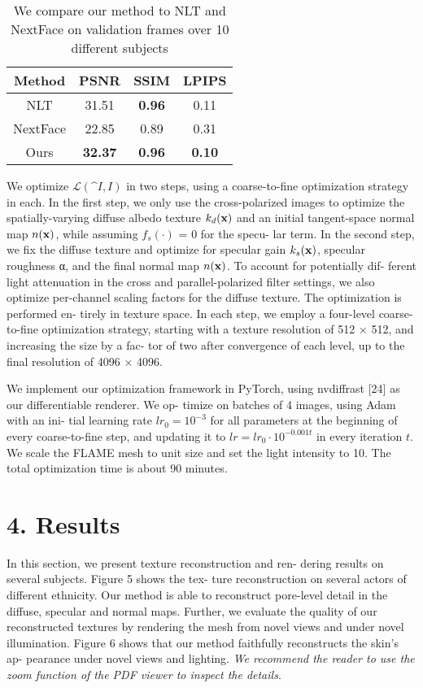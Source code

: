 \documentclass[twocolumn]{article}
\begin{document}
\begin{table}[]
    \centering
    \begin{tabular}{c c c c}
         \textbf{Method} &  \textbf{PSNR} & \textbf{SSIM} & \textbf{LPIPS}\\ \hline
         NLT & 31.51 & \textbf{0.96} & 0.11 \\
         NextFace & 22.85 & 0.89 & 0.31 \\\hline
         Ours & \textbf{32.37} & \textbf{0.96} & \textbf{0.10} \\\hline
    \end{tabular}
    \caption{We compare our method to NLT and NextFace on validation frames over 10 different subjects}
    \label{tab:Table 1}
\end{table}


\newpage
\indent We optimize $\mathcal{L}(\^I,I)$ in two steps, using a coarse-to-fine
optimization strategy in each. In the ﬁrst step, we only use
the cross-polarized images to optimize the spatially-varying
diffuse albedo texture ${k}_{d}({\bf x})$ and an initial tangent-space
normal map $n({\bf x})$, while assuming ${f}_{s}(\cdot)$ = 0 for the specu-
lar term. In the second step, we ﬁx the diffuse texture and
optimize for specular gain ${k}_{s}({\bf x})$, specular roughness α, and
the ﬁnal normal map $n({\bf x})$. To account for potentially dif-
ferent light attenuation in the cross and parallel-polarized
ﬁlter settings, we also optimize per-channel scaling factors
for the diffuse texture. The optimization is performed en-
tirely in texture space. In each step, we employ a four-level
coarse-to-ﬁne optimization strategy, starting with a texture
resolution of 512 × 512, and increasing the size by a fac-
tor of two after convergence of each level, up to the ﬁnal
resolution of 4096 × 4096.


We implement our optimization framework in PyTorch,
using nvdiffrast [24] as our differentiable renderer. We op-
timize on batches of 4 images, using Adam with an ini-
tial learning rate ${lr}_{0} = 10^{-3}$ for all parameters at the
beginning of every coarse-to-ﬁne step, and updating it to
$lr = {lr}_{0} \cdot 10^{-0.001t}$ in every iteration $t$. We scale the
FLAME mesh to unit size and set the light intensity to 10.
The total optimization time is about 90 minutes.

\section*{4. Results}
In this section, we present texture reconstruction and ren-
dering results on several subjects. Figure 5 shows the tex-
ture reconstruction on several actors of different ethnicity.
Our method is able to reconstruct pore-level detail in the
diffuse, specular and normal maps. Further, we evaluate the
quality of our reconstructed textures by rendering the mesh
from novel views and under novel illumination. Figure 6
shows that our method faithfully reconstructs the skin’s ap-
pearance under novel views and lighting. \textit{We recommend
the reader to use the zoom function of the PDF viewer to
inspect the details}.
\end{document}
